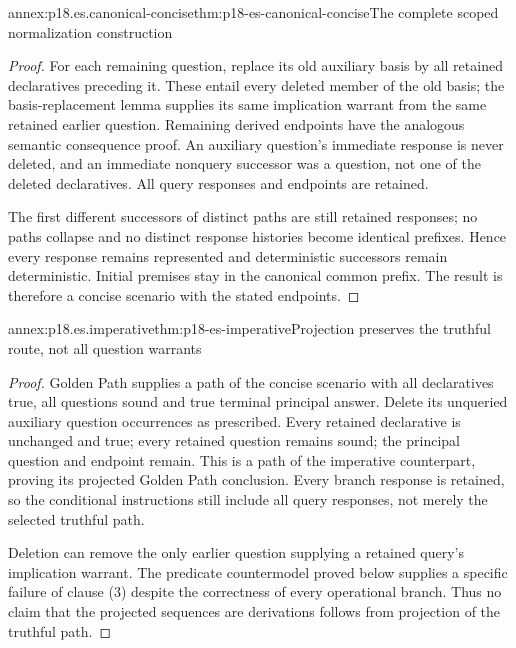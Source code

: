 \begin{annexitem}{annex:p18.es.canonical-concise}{thm:p18-es-canonical-concise}{The complete scoped normalization construction}
\begin{proof}
For each remaining question, replace its old auxiliary basis by all retained
declaratives preceding it. These entail every deleted member of the old basis;
the basis-replacement lemma supplies its same implication warrant from the
same retained earlier question. Remaining derived endpoints have the analogous
semantic consequence proof. An auxiliary question's immediate response is
never deleted, and an immediate nonquery successor was a question, not one
of the deleted declaratives. All query responses and endpoints are retained.

The first different successors of distinct paths are still retained responses;
no paths collapse and no distinct response histories become identical prefixes.
Hence every response remains represented and deterministic successors remain
deterministic. Initial premises stay in the canonical common prefix. The
result is therefore a concise scenario with the stated endpoints.
\end{proof}
\end{annexitem}

\begin{annexitem}{annex:p18.es.imperative}{thm:p18-es-imperative}{Projection preserves the truthful route, not all question warrants}
\begin{proof}
Golden Path supplies a path of the concise scenario with all declaratives
true, all questions sound and true terminal principal answer. Delete its
unqueried auxiliary question occurrences as prescribed. Every retained
declarative is unchanged and true; every retained question remains sound;
the principal question and endpoint remain. This is a path of the imperative
counterpart, proving its projected Golden Path conclusion. Every branch
response is retained, so the conditional instructions still include all
query responses, not merely the selected truthful path.

Deletion can remove the only earlier question supplying a retained query's
implication warrant. The predicate countermodel proved below supplies a
specific failure of clause (3) despite the correctness of every operational
branch. Thus no claim that the projected sequences are derivations follows
from projection of the truthful path.
\end{proof}
\end{annexitem}

